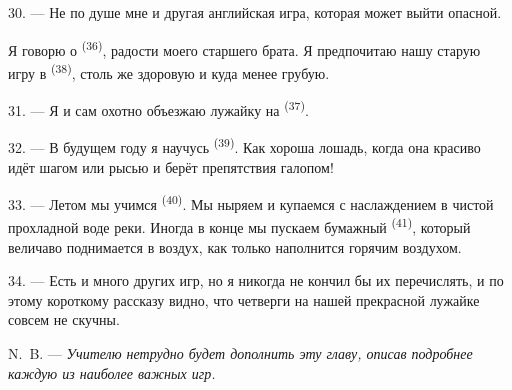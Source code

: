 30. --- Не по душе мне и другая английская игра, которая может выйти
опасной.

Я говорю о  \textsuperscript{(36)}, радости моего старшего
брата. Я предпочитаю нашу старую игру в  \textsuperscript{(38)},
столь же здоровую и куда менее грубую.

\VUsaut{4.6mm}
\VUsaut{3.0mm}

31. --- Я и сам охотно объезжаю лужайку на 
\textsuperscript{(37)}.

32. --- В будущем году я научусь  \textsuperscript{(39)}.
Как хороша лошадь, когда она красиво идёт шагом или рысью и берёт
препятствия галопом!

33. --- Летом мы учимся  \textsuperscript{(40)}. Мы ныряем и
купаемся с наслаждением в чистой прохладной воде реки. Иногда в конце мы
пускаем бумажный  \textsuperscript{(41)}, который величаво
поднимается в воздух, как только наполнится горячим воздухом.

34. --- Есть и много других игр, но я никогда не кончил бы их
перечислять, и по этому короткому рассказу видно, что четверги на нашей
прекрасной лужайке совсем не скучны.

N.~B. --- \textit{Учителю нетрудно будет дополнить эту главу, описав
подробнее каждую из наиболее важных игр.}
\VUsaut{6.0mm}
\VUfilet{22mm}
